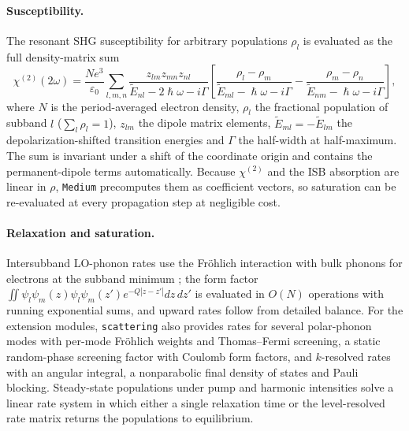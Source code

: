 \documentclass[11pt]{article}
\newcommand{\chitwo}{\chi^{(2)}}
\newcommand{\code}[1]{\texttt{#1}}
\begin{document}
\paragraph{Susceptibility.} The resonant SHG susceptibility for arbitrary populations $\rho_l$ is evaluated as the full density-matrix sum \cite{Boyd2008,Rosencher1991}
\begin{equation}
\chitwo(2\omega)=\frac{Ne^3}{\varepsilon_0}\sum_{l,m,n}\frac{z_{lm}z_{mn}z_{nl}}{\tilde E_{nl}-2\hslash\omega-i\Gamma}\left[\frac{\rho_l-\rho_m}{\tilde E_{ml}-\hslash\omega-i\Gamma}-\frac{\rho_m-\rho_n}{\tilde E_{nm}-\hslash\omega-i\Gamma}\right],
\end{equation}
where $N$ is the period-averaged electron density, $\rho_l$ the fractional population of subband $l$ ($\sum_l\rho_l=1$), $z_{lm}$ the dipole matrix elements, $\tilde E_{ml}=-\tilde E_{lm}$ the depolarization-shifted transition energies and $\Gamma$ the half-width at half-maximum. The sum is invariant under a shift of the coordinate origin and contains the permanent-dipole terms automatically. Because $\chitwo$ and the ISB absorption are linear in $\rho$, \code{Medium} precomputes them as coefficient vectors, so saturation can be re-evaluated at every propagation step at negligible cost.

\paragraph{Relaxation and saturation.} Intersubband LO-phonon rates use the Fr\"ohlich interaction with bulk phonons for electrons at the subband minimum \cite{Ferreira1989}; the form factor $\iint\psi_l\psi_m(z)\psi_l\psi_m(z')e^{-Q|z-z'|}dz\,dz'$ is evaluated in $O(N)$ operations with running exponential sums, and upward rates follow from detailed balance. For the extension modules, \code{scattering} also provides rates for several polar-phonon modes with per-mode Fr\"ohlich weights and Thomas--Fermi screening, a static random-phase screening factor with Coulomb form factors, and $k$-resolved rates with an angular integral, a nonparabolic final density of states and Pauli blocking. Steady-state populations under pump and harmonic intensities solve a linear rate system in which either a single relaxation time or the level-resolved rate matrix returns the populations to equilibrium.
\end{document}
